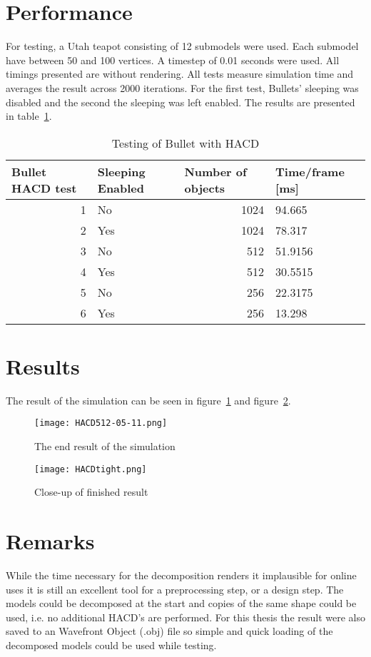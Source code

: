 \section{Performance}
For testing, a Utah teapot consisting of 12 submodels were used. Each submodel have
between 50 and 100 vertices. A timestep of 0.01 seconds were used. All timings
presented are without rendering. All tests measure simulation
time and averages the result across 2000 iterations. For the first test, Bullets' sleeping was
disabled and the second the sleeping was left enabled. The results are presented
in table~\ref{tab:hacdtest}.

\begin{table}[htbp]
\caption{Testing of Bullet with HACD}
\begin{center}
\begin{tabular}{|r|l|r|l|}
\hline
\multicolumn{1}{|l|}{\textbf{Bullet HACD test}} & \textbf{Sleeping Enabled} & \multicolumn{1}{l|}{\textbf{Number of objects}} & \textbf{Time/frame [ms]} \\ \hline
1 & No & 1024 & 94.665 \\ \hline
2 & Yes  & 1024 & 78.317 \\ \hline
3 & No & 512 & 51.9156 \\ \hline
4 & Yes  & 512 & 30.5515 \\ \hline
5 & No & 256 & 22.3175 \\ \hline
6 & Yes  & 256 & 13.298 \\ \hline
\end{tabular}
\end{center}
\label{tab:hacdtest}
\end{table}


\section{Results}
The result of the simulation can be seen in figure~\ref{fig:hacd0.0} and figure~\ref{fig:tight}.
\begin{figure}[H]
  \centering
  \texttt{[image: HACD512-05-11.png]}
  \caption{The end result of the simulation}
  \label{fig:hacd0.0}
\end{figure}

\begin{figure}[H]
  \centering
  \texttt{[image: HACDtight.png]}
  \caption{Close-up of finished result}
  \label{fig:tight}
\end{figure}

\section{Remarks}
While the time necessary for the decomposition renders it implausible for online uses
it is still an excellent tool for a preprocessing step, or a design step.
The models could be
decomposed at the start and copies of the same shape could be used, i.e. no additional
HACD's are performed. For this thesis the result were also saved to an Wavefront Object (.obj) file so simple and quick
 loading of the decomposed models could be used while testing.

